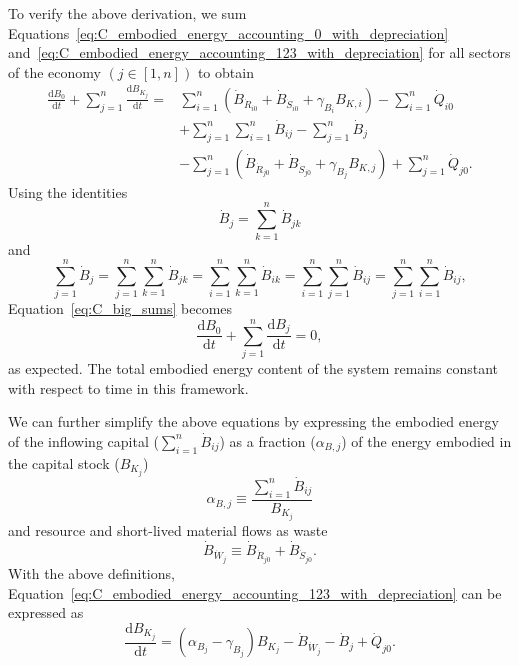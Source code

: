 To verify the above derivation, 
we sum 
Equations~\ref{eq:C_embodied_energy_accounting_0_with_depreciation} 
and~\ref{eq:C_embodied_energy_accounting_123_with_depreciation} 
for all sectors of the economy $\left( j \in [1,n] \right)$ to obtain
%
\begin{equation} \label{eq:C_big_sums}
	\begin{split}
		\frac{\mathrm{d}B_{0}}{\mathrm{d}t} 
		+ \sum\limits_{j=1}^n \frac{\mathrm{d}B_{K_{j}}}{\mathrm{d}t} 
		= & 
		 \sum\limits_{i=1}^n 
			\left( \dot{B}_{\dot{R}_{i0}} 
					+ \dot{B}_{\dot{S}_{i0}} 
					+ \gamma_{B_{i}} B_{K,i} \right)
		- \sum\limits_{i=1}^n \dot{Q}_{i0} \\
		& + \sum\limits_{j=1}^n \sum\limits_{i=1}^n \dot{B}_{ij}
		- \sum\limits_{j=1}^n \dot{B}_{j}	\\
		& - \sum\limits_{j=1}^n
				\left( \dot{B}_{\dot{R}_{j0}}
					+ \dot{B}_{\dot{S}_{j0}}
					+ \gamma_{B_{j}} B_{K,j} \right)
		+ \sum\limits_{j=1}^n \dot{Q}_{j0}.
	\end{split}
\end{equation}
%
Using the identities
%
\begin{equation} \label{eq:B_identity_1}
	\dot{B}_{j}  
	= \sum\limits_{k=1}^n \dot{B}_{jk}
\end{equation} 
%
and
%
\begin{equation} \label{eq:B_identity_2}
	\sum\limits_{j=1}^n\dot{B}_{j}  
	= \sum\limits_{j=1}^n \sum\limits_{k=1}^n \dot{B}_{jk}
	= \sum\limits_{i=1}^n \sum\limits_{k=1}^n \dot{B}_{ik}
	= \sum\limits_{i=1}^n \sum\limits_{j=1}^n \dot{B}_{ij}
	= \sum\limits_{j=1}^n \sum\limits_{i=1}^n \dot{B}_{ij},
\end{equation}
%
Equation~\ref{eq:C_big_sums} becomes
%
\begin{equation} \label{eq:C-B_sums_to_zero}
	\frac{\mathrm{d}B_{0}}{\mathrm{d}t} 
	+ \sum\limits_{j=1}^n \frac{\mathrm{d}B_{j}}{\mathrm{d}t} 
	= 0,
\end{equation}
%
as expected. The total embodied energy content of the system 
remains constant with respect to time in this framework.

We can further simplify the above equations by expressing
the embodied energy of the inflowing capital ($\sum_{i=1}^{n} \dot{B}_{ij}$)
as a fraction ($\alpha_{B,j}$) of the energy embodied in the capital stock ($B_{K_{j}}$)
%
\begin{equation}
	\alpha_{B,j}
	\equiv \frac{\sum\limits_{i=1}^n\dot{B}_{ij}}{B_{K_{j}}}
\end{equation}
%
and resource and short-lived material flows as waste
%
\begin{equation}
	\dot{B}_{\dot{W}_{j}}
	\equiv \dot{B}_{\dot{R}_{j0}}
	+ \dot{B}_{\dot{S}_{j0}}.
\end{equation}
%
With the above definitions, 
Equation~\ref{eq:C_embodied_energy_accounting_123_with_depreciation}
can be expressed as
%
\begin{equation} \label{eq:dBdt_with_alpha}
	\frac{\mathrm{d}B_{K_{j}}}{\mathrm{d}t} 
	= (\alpha_{B_{j}} - \gamma_{B_{j}}) B_{K_{j}}
	- \dot{B}_{\dot{W}_{j}} 
	- \dot{B}_{j}
	+ \dot{Q}_{j0}.
\end{equation}

